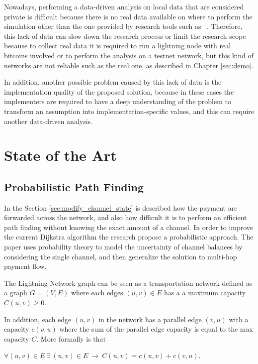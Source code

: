 Nowadays, performing a data-driven analysis on local data that are considered private
is difficult because there is no real data available on where to perform the simulation
other than the one provided by research tools such as ~\cite{lngossip}.
Therefore, this lack of data can slow down the research process or limit the 
research scope because to collect real data it is required to run a lightning node 
with real bitcoins involved or to perform the analysis on a 
testnet network, but this kind of networks are not reliable such as 
the real one, as described in Chapter \ref{sec:demo}.

In addition, another possible problem caused by this lack of data is the implementation
quality of the proposed solution, because in these cases 
the implementers are required to have a deep understanding of the problem 
to transform an assumption into implementation-specific values, 
and this can require another data-driven analysis.

\section{State of the Art}

\subsection{Probabilistic Path Finding}

In the Section \ref{sec:modify_channel_state} is described how the payment are
forwarded across the network, and also how difficult it is to perform an efficient 
path finding without knowing the exact amount of a channel. 
In order to improve the current Dijkstra algorithm the research \cite{DBLP:journals/corr/abs-2103-08576}
propose a probabilistic approach.
The paper \cite{DBLP:journals/corr/abs-2103-08576} uses probability theory to 
model the uncertainty of channel balances by considering the single channel, 
and then generalize the solution to multi-hop payment flow.

The Lightning Network graph can be seen as a transportation network 
defined as a graph $G = (V, E)$ where each edges $(u, v) \in E$ has a 
a maximum capacity $C(u, v) \ge 0$.

In addition, each edge $(u, v)$ in the network has a parallel edge $(v, u)$ 
with a capacity $c(v, u)$ where the sum of the parallel edge capacity is
equal to the max capacity $C$. More formally is that 

\begin{center}
    $\forall (u, v) \in E \: \exists \: (u, v) \in E \: \rightarrow \: C(u, v) = c(u, v) + c(v, u)$.
\end{center}

